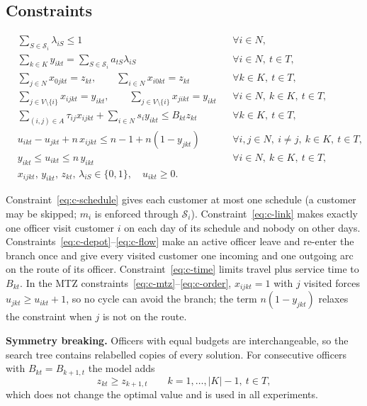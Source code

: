 \documentclass[11pt,a4paper]{article}
\begin{document}
\subsection{Constraints}
\begin{align}
&\sum_{S\in\mathcal S_i}\lambda_{iS}\le 1
  && \forall i\in N, \label{eq:c-schedule}\\
&\sum_{k\in K} y_{ikt}=\sum_{S\in\mathcal S_i} a_{tS}\lambda_{iS}
  && \forall i\in N,\ t\in T, \label{eq:c-link}\\
&\sum_{j\in N} x_{0jkt}=z_{kt},\qquad \sum_{i\in N} x_{i0kt}=z_{kt}
  && \forall k\in K,\ t\in T, \label{eq:c-depot}\\
&\sum_{j\in V\setminus\{i\}} x_{ijkt}=y_{ikt},\qquad
 \sum_{j\in V\setminus\{i\}} x_{jikt}=y_{ikt}
  && \forall i\in N,\ k\in K,\ t\in T, \label{eq:c-flow}\\
&\sum_{(i,j)\in A}\tau_{ij}x_{ijkt}+\sum_{i\in N}s_i y_{ikt}\le B_{kt}z_{kt}
  && \forall k\in K,\ t\in T, \label{eq:c-time}\\
&u_{ikt}-u_{jkt}+n\,x_{ijkt}\le n-1+n(1-y_{jkt})
  && \forall i,j\in N,\ i\ne j,\ k\in K,\ t\in T, \label{eq:c-mtz}\\
&y_{ikt}\le u_{ikt}\le n\,y_{ikt}
  && \forall i\in N,\ k\in K,\ t\in T, \label{eq:c-order}\\
&x_{ijkt},\,y_{ikt},\,z_{kt},\,\lambda_{iS}\in\{0,1\},\quad u_{ikt}\ge 0. \label{eq:c-domain}
\end{align}

Constraint~\eqref{eq:c-schedule} gives each customer at most one schedule
(a customer may be skipped; $m_i$ is enforced through $\mathcal S_i$).
Constraint~\eqref{eq:c-link} makes exactly one officer visit customer $i$ on
each day of its schedule and nobody on other days.
Constraints~\eqref{eq:c-depot}--\eqref{eq:c-flow} make an active officer
leave and re-enter the branch once and give every visited customer one
incoming and one outgoing arc on the route of its officer.
Constraint~\eqref{eq:c-time} limits travel plus service time to $B_{kt}$.
In the MTZ constraints~\eqref{eq:c-mtz}--\eqref{eq:c-order}, $x_{ijkt}=1$
with $j$ visited forces $u_{jkt}\ge u_{ikt}+1$, so no cycle can avoid the
branch; the term $n(1-y_{jkt})$ relaxes the constraint when $j$ is not on
the route.

\textbf{Symmetry breaking.} Officers with equal budgets are
interchangeable, so the search tree contains relabelled copies of every
solution. For consecutive officers with $B_{kt}=B_{k+1,t}$ the model adds
\begin{equation}
z_{kt}\ge z_{k+1,t}\qquad k=1,\dots,|K|-1,\ t\in T,
\label{eq:c-symmetry}
\end{equation}
which does not change the optimal value and is used in all experiments.
\end{document}
